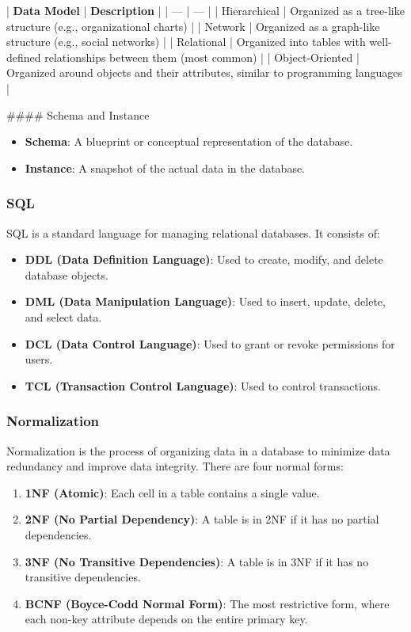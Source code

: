 \documentclass[11pt,letterpaper]{article}
\begin{document}
| \textbf{Data Model} | \textbf{Description} |
| --- | --- |
| Hierarchical | Organized as a tree-like structure (e.g., organizational charts) |
| Network | Organized as a graph-like structure (e.g., social networks) |
| Relational | Organized into tables with well-defined relationships between them (most common) |
| Object-Oriented | Organized around objects and their attributes, similar to programming languages |

#### Schema and Instance
\begin{itemize}
  \item \textbf{Schema}: A blueprint or conceptual representation of the database.
  \item \textbf{Instance}: A snapshot of the actual data in the database.
\end{itemize}

\subsubsection*{SQL}
SQL is a standard language for managing relational databases. It consists of:
\begin{itemize}
  \item \textbf{DDL (Data Definition Language)}: Used to create, modify, and delete database objects.
  \item \textbf{DML (Data Manipulation Language)}: Used to insert, update, delete, and select data.
  \item \textbf{DCL (Data Control Language)}: Used to grant or revoke permissions for users.
  \item \textbf{TCL (Transaction Control Language)}: Used to control transactions.
\end{itemize}

\subsubsection*{Normalization}
Normalization is the process of organizing data in a database to minimize data redundancy and improve data integrity. There are four normal forms:
\begin{enumerate}
  \item \textbf{1NF (Atomic)}: Each cell in a table contains a single value.
  \item \textbf{2NF (No Partial Dependency)}: A table is in 2NF if it has no partial dependencies.
  \item \textbf{3NF (No Transitive Dependencies)}: A table is in 3NF if it has no transitive dependencies.
  \item \textbf{BCNF (Boyce-Codd Normal Form)}: The most restrictive form, where each non-key attribute depends on the entire primary key.
\end{enumerate}
\end{document}
